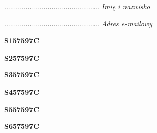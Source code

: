 \begin{turn}{90}\begin{minipage}{\linewidth} \vspace{20mm} ................................................  \textit{Imię i nazwisko}\end{minipage}\end{turn}

\begin{turn}{90}\begin{minipage}{\linewidth} \vspace{20mm} ................................................  \textit{Adres e-mailowy}\end{minipage}\end{turn}

\begin{turn}{90}\huge \begin{minipage}{\linewidth} \vspace{10mm}\textbf{S157597C}\end{minipage}\end{turn}

\begin{turn}{90}\huge \begin{minipage}{\linewidth} \vspace{10mm}\textbf{S257597C}\end{minipage}\end{turn}

\begin{turn}{90}\huge \begin{minipage}{\linewidth} \vspace{10mm}\textbf{S357597C}\end{minipage}\end{turn}

\begin{turn}{90}\huge \begin{minipage}{\linewidth} \vspace{10mm}\textbf{S457597C}\end{minipage}\end{turn}

\begin{turn}{90}\huge \begin{minipage}{\linewidth} \vspace{10mm}\textbf{S557597C}\end{minipage}\end{turn}

\begin{turn}{90}\huge \begin{minipage}{\linewidth} \vspace{10mm}\textbf{S657597C}\end{minipage}\end{turn}

